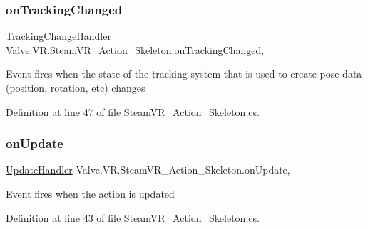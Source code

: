 \subsubsection{\texorpdfstring{onTrackingChanged}{onTrackingChanged}}
{\footnotesize\ttfamily \mbox{\hyperlink{class_valve_1_1_v_r_1_1_steam_v_r___action___skeleton_a460bcda41aa359ec14435212bed2b856}{Tracking\+Change\+Handler}} Valve.\+V\+R.\+Steam\+V\+R\+\_\+\+Action\+\_\+\+Skeleton.\+on\+Tracking\+Changed\hspace{0.3cm}{\ttfamily [add]}, {\ttfamily [remove]}}



Event fires when the state of the tracking system that is used to create pose data (position, rotation, etc) changes 



Definition at line 47 of file Steam\+V\+R\+\_\+\+Action\+\_\+\+Skeleton.\+cs.

\mbox{\label{class_valve_1_1_v_r_1_1_steam_v_r___action___skeleton_a3c9274e83076910a3b6a797cd53052b3}} 
\subsubsection{\texorpdfstring{onUpdate}{onUpdate}}
{\footnotesize\ttfamily \mbox{\hyperlink{class_valve_1_1_v_r_1_1_steam_v_r___action___skeleton_a9fd666c2f3ccefc435275d85c525337c}{Update\+Handler}} Valve.\+V\+R.\+Steam\+V\+R\+\_\+\+Action\+\_\+\+Skeleton.\+on\+Update\hspace{0.3cm}{\ttfamily [add]}, {\ttfamily [remove]}}



Event fires when the action is updated 



Definition at line 43 of file Steam\+V\+R\+\_\+\+Action\+\_\+\+Skeleton.\+cs.

\mbox{\label{class_valve_1_1_v_r_1_1_steam_v_r___action___skeleton_ae6921e89e087c4183ccf6167ca37cd61}} 
